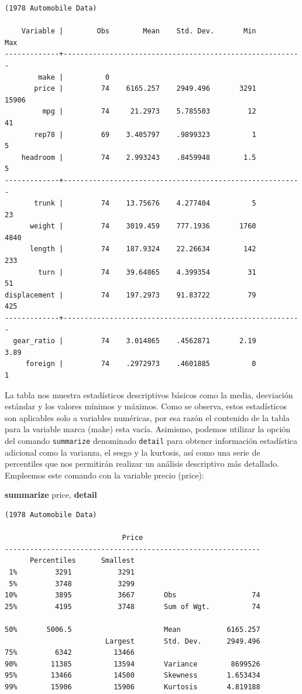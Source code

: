 \documentclass[
]{book}
\newenvironment{Shaded}{\begin{snugshade}}{\end{snugshade}}
\newcommand{\KeywordTok}[1]{\textcolor[rgb]{0.13,0.29,0.53}{\textbf{#1}}}
\newcommand{\NormalTok}[1]{#1}
\theoremstyle{definition}
\theoremstyle{definition}
\theoremstyle{definition}
\theoremstyle{definition}
\theoremstyle{remark}
\begin{document}
\begin{verbatim}
(1978 Automobile Data)

    Variable |        Obs        Mean    Std. Dev.       Min        Max
-------------+---------------------------------------------------------
        make |          0
       price |         74    6165.257    2949.496       3291      15906
         mpg |         74     21.2973    5.785503         12         41
       rep78 |         69    3.405797    .9899323          1          5
    headroom |         74    2.993243    .8459948        1.5          5
-------------+---------------------------------------------------------
       trunk |         74    13.75676    4.277404          5         23
      weight |         74    3019.459    777.1936       1760       4840
      length |         74    187.9324    22.26634        142        233
        turn |         74    39.64865    4.399354         31         51
displacement |         74    197.2973    91.83722         79        425
-------------+---------------------------------------------------------
  gear_ratio |         74    3.014865    .4562871       2.19       3.89
     foreign |         74    .2972973    .4601885          0          1
\end{verbatim}

La tabla nos muestra estadísticos descriptivos básicos como la media, desviación estándar y los valores mínimos y máximos. Como se observa, estos estadísticos son aplicables solo a variables numéricas, por esa razón el contenido de la tabla para la variable marca (make) esta vacía. Asimismo, podemos utilizar la opción del comando \texttt{summarize} denominado \texttt{detail} para obtener información estadística adicional como la varianza, el sesgo y la kurtosis, así como una serie de percentiles que nos permitirán realizar un análisis descriptivo más detallado. Empleemos este comando con la variable precio (price):

\begin{Shaded}
\begin{Highlighting}[]
\KeywordTok{summarize}\NormalTok{ price, }\KeywordTok{detail}
\end{Highlighting}
\end{Shaded}

\begin{verbatim}
(1978 Automobile Data)

                            Price
-------------------------------------------------------------
      Percentiles      Smallest
 1%         3291           3291
 5%         3748           3299
10%         3895           3667       Obs                  74
25%         4195           3748       Sum of Wgt.          74

50%       5006.5                      Mean           6165.257
                        Largest       Std. Dev.      2949.496
75%         6342          13466
90%        11385          13594       Variance        8699526
95%        13466          14500       Skewness       1.653434
99%        15906          15906       Kurtosis       4.819188
\end{verbatim}
\end{document}
